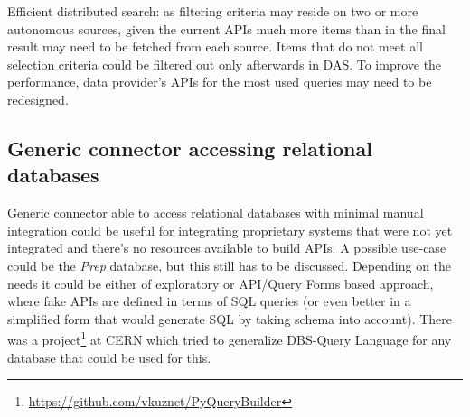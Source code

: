 \documentclass[a4paper,11pt,draft]{article}
\begin{document}
\begin{compactitem}
					
					\item Efficient distributed search: as filtering criteria may reside on two or more autonomous sources, given the current APIs much more items than in the final result may need to be fetched from each source. Items that do not meet all selection criteria could be filtered out only afterwards in DAS. To improve the performance, data provider's APIs for the most used queries may need to be redesigned.
\end{compactitem}

{\color{gray}
\subsection{Generic connector accessing relational databases}
Generic connector able to access relational databases with minimal manual integration could be useful for integrating proprietary systems that were not yet integrated and there's no resources available to build APIs. A possible use-case could be the \textit{Prep} database, but this still has to be discussed. 
%
Depending on the needs it could be either of exploratory or API/Query Forms based approach, where fake APIs are defined in terms of SQL queries (or even better in a simplified form that would generate SQL by taking schema into account).
There was a project\footnote{\url{https://github.com/vkuznet/PyQueryBuilder}}   at CERN which tried to generalize DBS-Query Language for any database that could be used for this.}








\end{document}

